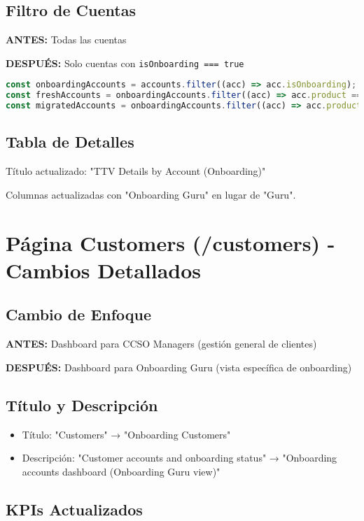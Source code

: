 \documentclass[12pt,a4paper]{article}
\begin{document}
\subsection{Filtro de Cuentas}
\textbf{ANTES:} Todas las cuentas

\textbf{DESPUÉS:} Solo cuentas con \texttt{isOnboarding === true}

\begin{lstlisting}[language=JavaScript]
const onboardingAccounts = accounts.filter((acc) => acc.isOnboarding);
const freshAccounts = onboardingAccounts.filter((acc) => acc.product === "Fresh QMS");
const migratedAccounts = onboardingAccounts.filter((acc) => acc.product === "Migrated QMS");
\end{lstlisting}

\subsection{Tabla de Detalles}
Título actualizado: "TTV Details by Account (Onboarding)"

Columnas actualizadas con "Onboarding Guru" en lugar de "Guru".

\section{Página Customers (/customers) - Cambios Detallados}

\subsection{Cambio de Enfoque}
\textbf{ANTES:} Dashboard para CCSO Managers (gestión general de clientes)

\textbf{DESPUÉS:} Dashboard para Onboarding Guru (vista específica de onboarding)

\subsection{Título y Descripción}
\begin{itemize}
    \item Título: "Customers" → "Onboarding Customers"
    \item Descripción: "Customer accounts and onboarding status" → "Onboarding accounts dashboard (Onboarding Guru view)"
\end{itemize}

\subsection{KPIs Actualizados}
\end{document}
